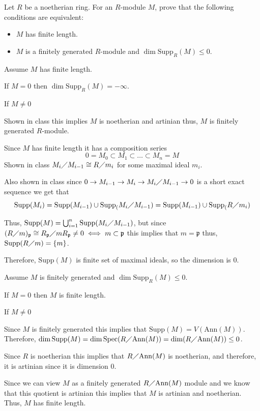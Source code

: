 \documentclass[12pt, letterpaper]{article}
\newcommand{\p}{\mathfrak{p}}
\newcommand{\Spec}{\mathrm{Spec}}
\newcommand{\Supp}{\mathrm{Supp}}
\newcommand{\Ann}{\mathrm{Ann}}
\begin{document}
\begin{problem}{}
    Let $R$ be a noetherian ring. For an $R$-module $M$, prove that the following conditions are
equivalent:
    \begin{itemize}
        \item $M$ has finite length.
        \item $M$ is a finitely generated $R$-module and $\dim \Supp_R(M) \leq 0$.
    \end{itemize}
\end{problem}
\begin{problemproof}
    Assume $M$ has finite length.

    If $M = 0$ then $\dim \Supp_R(M) = - \infty$.

    If $M \neq 0$
    
    Shown in class this implies $M$ is noetherian and artinian thus, $M$ is finitely generated $R$-module.

    Since $M$ has finite length it has a composition series
    \[0=M_0 \subset M_1 \subset \dots \subset M_n = M\]
    Shown in class $M_i \diagup M_{i-1} \cong R \diagup m_i$ for some maximal ideal $m_i$.

    Also shown in class since $0 \to M_{i-1} \to M_i \to M_i \diagup M_{i-1} \to 0$ is a short exact sequence we get that
    \[\Supp(M_i) = \Supp(M_{i-1}) \cup \Supp_(M_i \diagup M_{i-1}) = \Supp(M_{i-1}) \cup \Supp_(R \diagup m_i)\]

    Thus, $\Supp(M) = \bigcup_{i=1}^n \Supp(M_i \diagup M_{i-1})$,
    but since $(R \diagup m)_\p \cong R_\p \diagup mR_\p \neq 0 \iff m \subset \p$ this implies that $m=\p$ thus, $\Supp(R \diagup m)=\{m\}$.

    Therefore, $\Supp(M)$ is finite set of maximal ideals, so the dimension is 0.

    Assume $M$ is finitely generated and $\dim \Supp_R(M) \leq 0$.

    If $M = 0$ then $M$ is finite length.
    
    If $M \neq 0$

    Since $M$ is finitely generated this implies that $\Supp(M) = V(\Ann(M))$.
    Therefore, $\dim \Supp(M) = \dim \Spec(R \diagup \Ann(M)) = \dim(R \diagup \Ann(M)) \leq 0$.

    Since $R$ is noetherian this implies that $R \diagup \Ann(M)$ is noetherian, and therefore, it is artinian since it is dimension 0.

    Since we can view $M$ as a finitely generated $R \diagup \Ann(M)$ module and we know that this quotient is artinian this implies that $M$ is artinian and noetherian. Thus, $M$ has finite length.
\end{problemproof}
\end{document}
